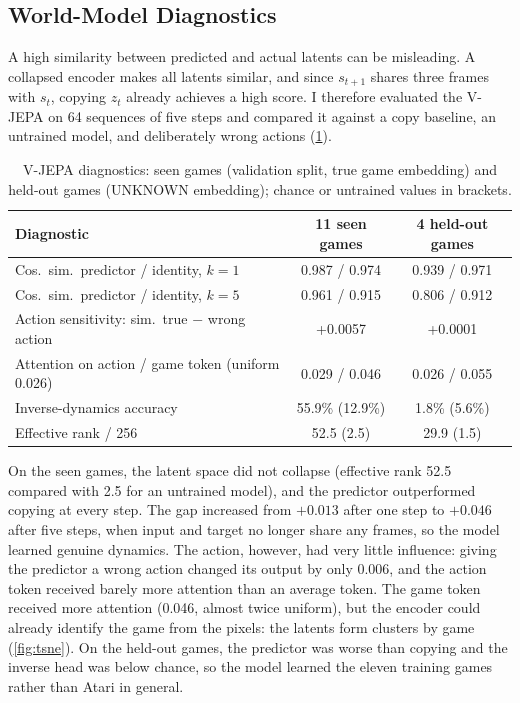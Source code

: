\documentclass[runningheads]{llncs}
\begin{document}
\FloatBarrier
\subsection{World-Model Diagnostics}
\label{sec:jepa-diag}

A high similarity between predicted and actual latents can be misleading. A collapsed encoder
makes all latents similar, and since $s_{t+1}$ shares three frames with $s_t$, copying $z_t$
already achieves a high score. I therefore evaluated the V-JEPA on 64 sequences of five steps
and compared it against a copy baseline, an untrained model, and deliberately wrong actions
(\cref{tab:jepa}).

\begin{table}[!htbp]
\centering
\caption{V-JEPA diagnostics: seen games (validation split, true game embedding) and held-out
games (UNKNOWN embedding); chance or untrained values in brackets.}
\label{tab:jepa}
\footnotesize\setlength{\tabcolsep}{4pt}
\begin{tabular}{@{}lcc@{}}
\toprule
Diagnostic & 11 seen games & 4 held-out games \\
\midrule
Cos.\ sim.\ predictor / identity, $k=1$ & 0.987 / 0.974 & 0.939 / 0.971 \\
Cos.\ sim.\ predictor / identity, $k=5$ & 0.961 / 0.915 & 0.806 / 0.912 \\
Action sensitivity: sim.\ true $-$ wrong action & +0.0057 & +0.0001 \\
Attention on action / game token (uniform 0.026) & 0.029 / 0.046 & 0.026 / 0.055 \\
Inverse-dynamics accuracy & 55.9\% (12.9\%) & 1.8\% (5.6\%) \\
Effective rank / 256 & 52.5 (2.5) & 29.9 (1.5) \\
\bottomrule
\end{tabular}
\end{table}

On the seen games, the latent space did not collapse (effective rank 52.5 compared with 2.5 for
an untrained model), and the predictor outperformed copying at every step. The gap increased
from $+0.013$ after one step to $+0.046$ after five steps, when input and target no longer share any frames, so the model learned genuine dynamics. The action, however, had very little influence: giving the predictor a wrong action changed its output by
only 0.006, and the action token received barely more attention than an average token. The
game token received more attention (0.046, almost twice uniform), but the encoder could already
identify the game from the pixels: the latents form clusters by game (\cref{fig:tsne}). On the
held-out games, the predictor was worse than copying and the inverse head was below
chance, so the model learned the eleven training games rather than Atari in general.
\end{document}
